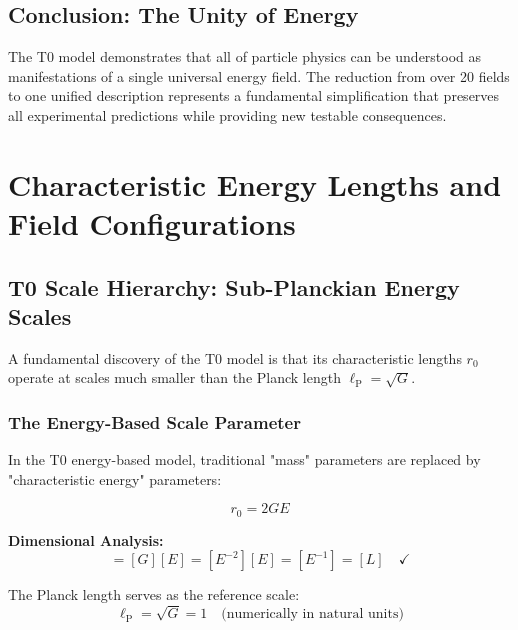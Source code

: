 \documentclass[12pt,a4paper]{report}
\newcommand{\lP}{\ell_{\text{P}}}         %
\newcommand{\rzero}{r_0}                  %
\begin{document}
	
	\section{Conclusion: The Unity of Energy}
	\label{sec:conclusion_unity}
	
	The T0 model demonstrates that all of particle physics can be understood as manifestations of a single universal energy field. The reduction from over 20 fields to one unified description represents a fundamental simplification that preserves all experimental predictions while providing new testable consequences.
	\chapter{Characteristic Energy Lengths and Field Configurations}
	\label{chap:energy_lengths_configurations}
	
	\section{T0 Scale Hierarchy: Sub-Planckian Energy Scales}
	\label{sec:scale_hierarchy}
	
	A fundamental discovery of the T0 model is that its characteristic lengths $\rzero$ operate at scales much smaller than the Planck length $\lP = \sqrt{G}$.
	
	\subsection{The Energy-Based Scale Parameter}
	\label{subsec:energy_based_scale_parameter}
	
	In the T0 energy-based model, traditional "mass" parameters are replaced by "characteristic energy" parameters:
	
	\begin{equation}
		\boxed{\rzero = 2GE}
		\label{eq:fundamental_r0}
	\end{equation}
	
	\textbf{Dimensional Analysis:}
	\begin{equation}
		[\rzero] = [G][E] = [E^{-2}][E] = [E^{-1}] = [L] \quad \checkmark
	\end{equation}
	
	The Planck length serves as the reference scale:
	\begin{equation}
		\lP = \sqrt{G} = 1 \quad \text{(numerically in natural units)}
	\end{equation}
	
\end{document}
